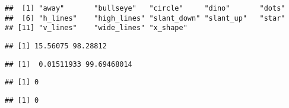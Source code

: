 \documentclass[
]{article}
\newenvironment{Shaded}{\begin{snugshade}}{\end{snugshade}}
\newcommand{\KeywordTok}[1]{\textcolor[rgb]{0.13,0.29,0.53}{\textbf{#1}}}
\newcommand{\NormalTok}[1]{#1}
\newcommand{\OperatorTok}[1]{\textcolor[rgb]{0.81,0.36,0.00}{\textbf{#1}}}
\begin{document}
\begin{verbatim}
##  [1] "away"       "bullseye"   "circle"     "dino"       "dots"      
##  [6] "h_lines"    "high_lines" "slant_down" "slant_up"   "star"      
## [11] "v_lines"    "wide_lines" "x_shape"
\end{verbatim}

\begin{Shaded}
\end{Shaded}

\begin{verbatim}
## [1] 15.56075 98.28812
\end{verbatim}

\begin{Shaded}
\end{Shaded}

\begin{verbatim}
## [1]  0.01511933 99.69468014
\end{verbatim}

\begin{Shaded}
\end{Shaded}

\begin{verbatim}
## [1] 0
\end{verbatim}

\begin{Shaded}
\end{Shaded}

\begin{verbatim}
## [1] 0
\end{verbatim}

\begin{Shaded}
\end{Shaded}
\end{document}
